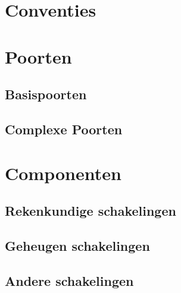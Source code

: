 \section{Conventies}
\section{Poorten}
\subsection{Basispoorten}
\subsection{Complexe Poorten}
\label{ss:appendixComplexePoorten}
\section{Componenten}
\subsection{Rekenkundige schakelingen}
\subsection{Geheugen schakelingen}
\subsection{Andere schakelingen}
